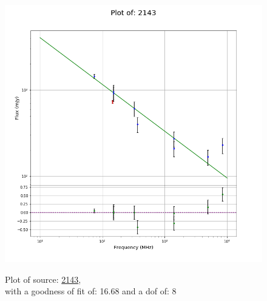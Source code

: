 \documentclass{article}
\begin{document}
\begin{figure}[H]
\begin{minipage}{0.5\textwidth}
        \includegraphics[scale = 0.35]{KmeulenTrap4P23_1hr/1hr2143.png}
        \captionsetup{labelformat=empty}
        \caption{Plot of source: \href{http://banana.transientskp.org/r4/vlo_KmeulenTrap4P23/runningcatalog/2143}{2143},\\with a goodness of fit of: 16.68 and a dof of: 8}
    \addtocounter{figure}{-1}
    \label{KmeulenTrap4P23:1hr:2143:plot}
    \end{minipage}
\end{figure}
\end{document}
